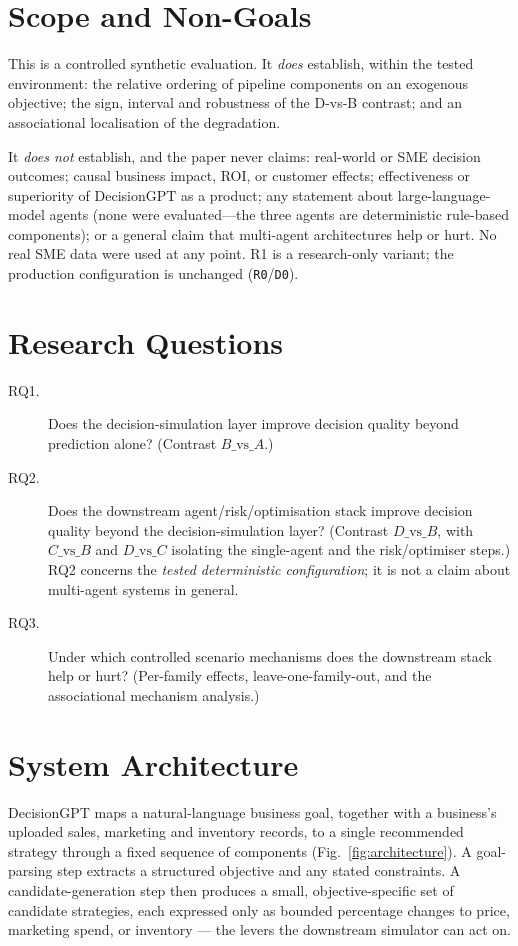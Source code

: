 \documentclass[10pt,twocolumn,a4paper]{article}
\newcommand{\code}[1]{\texttt{#1}}
\begin{document}
\section{Scope and Non-Goals}\label{sec:scope}
This is a controlled synthetic evaluation. It \emph{does} establish, within the
tested environment: the relative ordering of pipeline components on an exogenous
objective; the sign, interval and robustness of the D-vs-B contrast; and an
associational localisation of the degradation.

It \emph{does not} establish, and the paper never claims: real-world or SME
decision outcomes; causal business impact, ROI, or customer effects;
effectiveness or superiority of DecisionGPT as a product; any statement about
large-language-model agents (none were evaluated---the three agents are
deterministic rule-based components); or a general claim that multi-agent
architectures help or hurt. No real SME data were used at any point. R1 is a
research-only variant; the production configuration is unchanged
(\code{R0}/\code{D0}).

\section{Research Questions}\label{sec:rq}
\begin{description}
  \item[RQ1.] Does the decision-simulation layer improve decision quality beyond
        prediction alone? (Contrast $B\text{\_vs\_}A$.)
  \item[RQ2.] Does the downstream agent/risk/optimisation stack improve decision
        quality beyond the decision-simulation layer? (Contrast $D\text{\_vs\_}B$,
        with $C\text{\_vs\_}B$ and $D\text{\_vs\_}C$ isolating the single-agent
        and the risk/optimiser steps.) RQ2 concerns the \emph{tested
        deterministic configuration}; it is not a claim about multi-agent systems
        in general.
  \item[RQ3.] Under which controlled scenario mechanisms does the downstream
        stack help or hurt? (Per-family effects, leave-one-family-out, and the
        associational mechanism analysis.)
\end{description}

\section{System Architecture}\label{sec:arch}
DecisionGPT maps a natural-language business goal, together with a business's
uploaded sales, marketing and inventory records, to a single recommended
strategy through a fixed sequence of components (Fig.~\ref{fig:architecture}). A
goal-parsing step extracts a structured objective and any stated constraints. A
candidate-generation step then produces a small, objective-specific set of
candidate strategies, each expressed only as bounded percentage changes to
price, marketing spend, or inventory --- the levers the downstream simulator can
act on.
\end{document}
